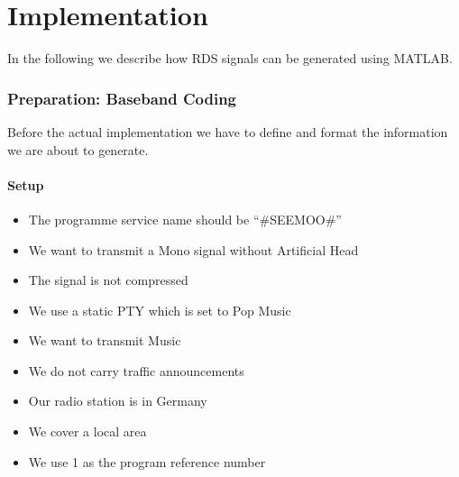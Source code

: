 \documentclass[sigconf]{acmart}
\begin{document}



\section{Implementation}

In the following we describe how RDS signals can be generated using MATLAB.

\hypertarget{Preparation:ux20Basebandux20Coding}{%
\subsubsection{Preparation: Baseband
Coding}\label{Preparation:ux20Basebandux20Coding}}

Before the actual implementation we have to define and format the
information we are about to generate.

\hypertarget{Setup}{%
\paragraph{Setup}\label{Setup}}

\begin{itemize}
\tightlist
\item The programme service name should be ``\#SEEMOO\#''
\item We want to transmit a Mono signal without Artificial Head
\item The signal is not compressed
\item We use a static PTY which is set to Pop Music
\item We want to transmit Music
\item We do not carry traffic announcements
\item Our radio station is in Germany
\item We cover a local area
\item We use 1 as the program reference number
\end{itemize}
\end{document}
